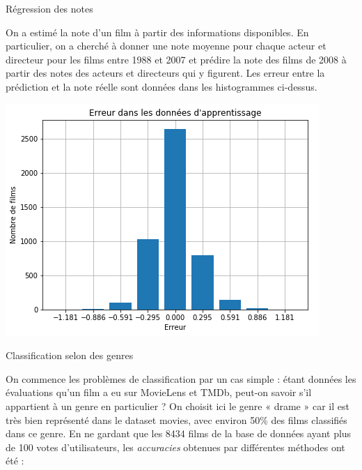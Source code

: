 \documentclass[10pt]{article}
\theoremstyle{plain}
\theoremstyle{definition}
\numberwithin{table}{section}
\numberwithin{figure}{section}
\numberwithin{equation}{section}
\begin{document}
\begin{center}
{\begin{minipage}{21cm}
\begin{multicols}{3}
\bigskip

\begin{tcolorbox}[colback=blue!10, colframe=blue!75!black]
\centering\Large
Régression des notes
\end{tcolorbox}

On a estimé la note d'un film à partir des informations disponibles. En particulier, on a cherché à donner une note moyenne pour chaque acteur et directeur pour les films entre 1988 et 2007 et prédire la note des films de 2008 à partir des notes des acteurs et directeurs qui y figurent. Les erreur entre la prédiction et la note réelle sont données dans les histogrammes ci-dessus.

\includegraphics[width=\columnwidth]{regressionApprent}

\columnbreak

\begin{tcolorbox}[colback=blue!10, colframe=blue!75!black]
\centering\Large
Classification selon des genres
\end{tcolorbox}

On commence les problèmes de classification par un cas simple : étant données les évaluations qu’un film a eu sur MovieLens et TMDb, peut-on savoir s’il appartient à un genre en particulier ? On choisit ici le genre « drame » car il est très bien représenté dans le dataset movies, avec environ 50\% des films classifiés dans ce genre. En ne gardant que les 8434 films de la base de données ayant plus de 100 votes d'utilisateurs, les \emph{accuracies} obtenues par différentes méthodes ont été :

\medskip


\end{multicols}
\end{minipage}}
\end{center}
\end{document}
